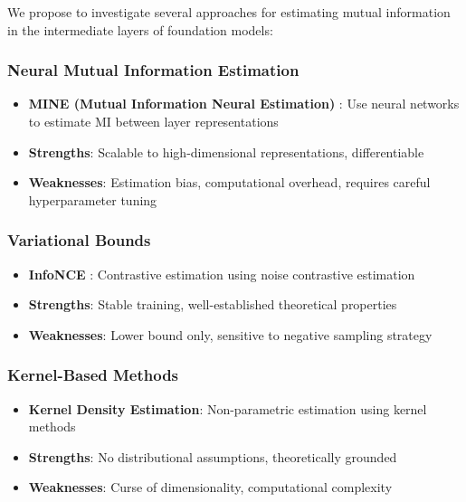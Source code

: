 We propose to investigate several approaches for estimating mutual information in the intermediate layers of foundation models: 

\subsubsection{Neural Mutual Information Estimation}
\begin{itemize}
    \item \textbf{MINE (Mutual Information Neural Estimation)} \citep{belghazi2018mutual}: Use neural networks to estimate MI between layer representations
    \item \textbf{Strengths}: Scalable to high-dimensional representations, differentiable
    \item \textbf{Weaknesses}: Estimation bias, computational overhead, requires careful hyperparameter tuning
\end{itemize}

\subsubsection{Variational Bounds}
\begin{itemize}
    \item \textbf{InfoNCE} \citep{oord2018representation}: Contrastive estimation using noise contrastive estimation
    \item \textbf{Strengths}: Stable training, well-established theoretical properties
    \item \textbf{Weaknesses}: Lower bound only, sensitive to negative sampling strategy
\end{itemize}

\subsubsection{Kernel-Based Methods}
\begin{itemize}
    \item \textbf{Kernel Density Estimation}: Non-parametric estimation using kernel methods
    \item \textbf{Strengths}: No distributional assumptions, theoretically grounded
    \item \textbf{Weaknesses}: Curse of dimensionality, computational complexity
\end{itemize}

